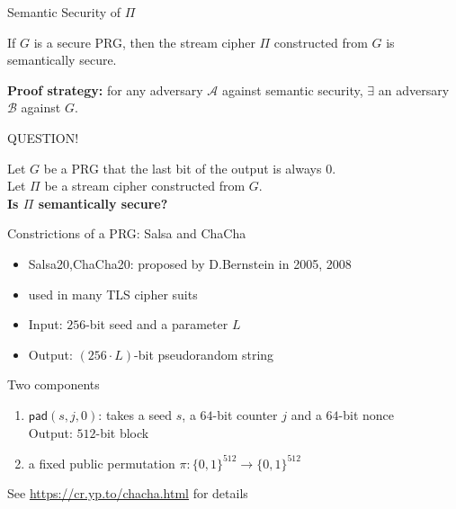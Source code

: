 \documentclass[usenames,dvipsnames, 9pt,aspectratio=169]{beamer}
\begin{document}

\begin{frame}{Semantic Security of $\Pi$}
\LARGE
	\begin{theorem}
		If $G$ is a secure PRG, then the stream cipher $\Pi$ constructed from $G$ is semantically secure.
	\end{theorem}
\vspace{20pt}
{\color{Orange}\textbf{Proof strategy: }} for any adversary $\mathcal{A}$ against semantic security, $\exists$ an adversary $\mathcal{B}$ against $G$.
\end{frame}

\begin{frame}{QUESTION!}
	\LARGE
	
	Let $G$ be a PRG that the last bit of the output is always 0. \\[10pt]
	Let $\Pi$ be a stream cipher constructed from $G$.\\[15pt]
	\centering
	{\color{Orange}\textbf{Is $\Pi$ semantically secure?}} 
\end{frame}



\begin{frame}{Constrictions of a PRG: Salsa and ChaCha}
\Large
	\begin{itemize}
		\item Salsa20,ChaCha20: proposed by D.Bernstein in 2005, 2008
		\item used in many TLS cipher suits
		\item Input: $256$-bit seed and a parameter $L$
		\item Output: $(256 \cdot L)$-bit pseudorandom string
	\end{itemize}
	\vspace{20pt}
	\pause
	Two components
	\begin{enumerate}
		\item $\mathsf{pad}(s, j, 0)$: takes a seed $s$, a $64$-bit counter $j$ and a $64$-bit nonce\\
		Output: $512$-bit block
		\item a fixed public permutation $\pi: \{0,1\}^{512} \rightarrow \{0,1\}^{512}$
	\end{enumerate}
	\vspace{20pt}
	See \url{https://cr.yp.to/chacha.html} for details
\end{frame}
\end{document}
